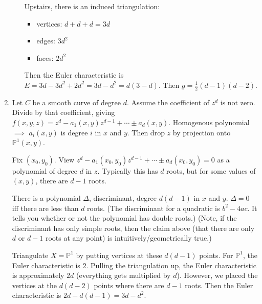 \documentclass [letterpaper,11pt,twoside] {article}
\begin{document}
\begin{enumerate}[{Method }I]
\begin{enumerate}[{Case }I]
          Upstairs, there is an induced triangulation:
          \begin{itemize}
            \item vertices: $d + d + d = 3d$
            \item edges: $3d^2$
            \item faces: $2d^2$
          \end{itemize}
          Then the Euler characteristic is $E = 3d- 3d^2 + 2d^2 = 3d - d^2 = d(3 - d)$.  Then $g = \frac12(d - 1)(d - 2)$.
        \end{enumerate}
      \item Let $C$ be a smooth curve of degree $d$.  Assume the coefficient of $z^d$ is not zero.  Divide by that coefficient, giving $f(x, y, z) = z^d - a_1(x, y) z^{d-1} + \cdots \pm a_d(x, y)$.  Homogenous polynomial $\implies$ $a_i(x, y)$ is degree $i$ in $x$ and $y$.  Then drop $z$ by projection onto $\mathbb P^1(x, y)$.

        Fix $(x_0, y_0)$.  View $z^d - a_1(x_0, y_0) z^{d-1} + \cdots \pm a_d(x_0, y_0) = 0$ as a polynomial of degree $d$ in $z$.  Typically this has $d$ roots, but for some values of $(x, y)$, there are $d-1$ roots.

        There is a polynomial $\Delta$, discriminant, degree $d(d - 1)$ in $x$ and $y$.  $\Delta = 0$ iff there are less than $d$ roots.  (The discriminant for a quadratic is $b^2 - 4ac$.  It tells you whether or not the polynomial has double roots.)  (Note, if the discriminant has only simple roots, then the claim above (that there are only $d$ or $d - 1$ roots at any point) is intuitively/geometrically true.)

        Triangulate $X = \mathbb P^1$ by putting vertices at these $d(d - 1)$ points.  For $\mathbb P^1$, the Euler characteristic is $2$.  Pulling the triangulation up, the Euler characteristic is approximately $2d$ (everything gets multiplied by $d$).  However, we placed the vertices at the $d(d - 2)$ points where there are $d - 1$ roots.  Then the Euler characteristic is $2d - d(d - 1) = 3d - d^2$.
    \end{enumerate}
\end{document}
